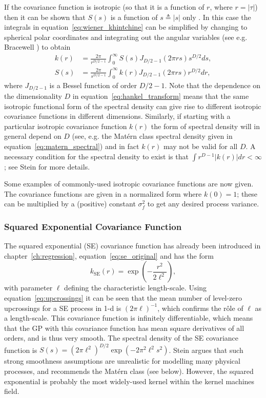 \documentclass[11pt]{book}
\begin{document}
If the covariance function is isotropic (so that it is a function of $r$, where $r = |\tau|$) then it can be shown that $S(s)$ is a function of $s \triangleq |s|$ only \cite{adler1981}. In this case the integrals in equation~\eqref{eq:wiener_khintchine} can be simplified by changing to spherical polar coordinates and integrating out the angular variables (see e.g. Bracewell \cite{bracewell1986}) to obtain
\begin{align}
\label{eq:hankel_transform}
k(r) &= \frac{2\pi}{r^{D/2-1}} \int_0^\infty S(s) J_{D/2-1}(2\pi rs) s^{D/2} ds, \\
S(s) &= \frac{2\pi}{s^{D/2-1}} \int_0^\infty k(r) J_{D/2-1}(2\pi rs) r^{D/2} dr, \nonumber
\end{align}
where $J_{D/2-1}$ is a Bessel function of order $D/2-1$. Note that the dependence on the dimensionality $D$ in equation~\eqref{eq:hankel_transform} means that the same isotropic functional form of the spectral density can give rise to different isotropic covariance functions in different dimensions. Similarly, if starting with a particular isotropic covariance function $k(r)$ the form of spectral density will in general depend on $D$ (see, e.g. the Matérn class spectral density given in equation~\eqref{eq:matern_spectral}) and in fact $k(r)$ may not be valid for all $D$. A necessary condition for the spectral density to exist is that $\int r^{D-1} |k(r)| dr < \infty$; see Stein \cite{stein1999} for more details.

Some examples of commonly-used isotropic covariance functions are now given. The covariance functions are given in a normalized form where $k(0) = 1$; these can be multiplied by a (positive) constant $\sigma_f^2$ to get any desired process variance.

\subsubsection{Squared Exponential Covariance Function}

The squared exponential (SE) covariance function has already been introduced in chapter~\ref{ch:regression}, equation~\eqref{eq:se_original} and has the form
\begin{equation}
\label{eq:se_covariance}
k_{\text{SE}}(r) = \exp\left(-\frac{r^2}{2\ell^2}\right),
\end{equation}
with parameter $\ell$ defining the characteristic length-scale. Using equation~\eqref{eq:upcrossings} it can be seen that the mean number of level-zero upcrossings for a SE process in 1-d is $(2\pi\ell)^{-1}$, which confirms the rôle of $\ell$ as a length-scale. This covariance function is infinitely differentiable, which means that the GP with this covariance function has mean square derivatives of all orders, and is thus very smooth. The spectral density of the SE covariance function is $S(s) = (2\pi\ell^2)^{D/2} \exp(-2\pi^2\ell^2 s^2)$. Stein \cite{stein1999} argues that such strong smoothness assumptions are unrealistic for modelling many physical processes, and recommends the Matérn class (see below). However, the squared exponential is probably the most widely-used kernel within the kernel machines field.
\end{document}
